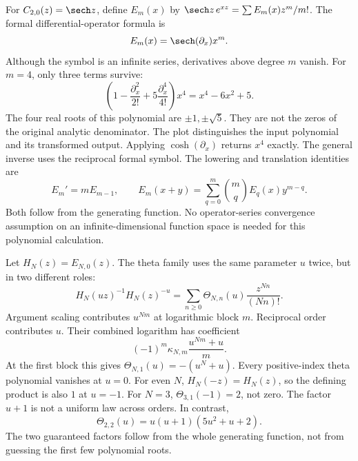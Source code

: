 For $C_{2,0}(z)=\sech z$, define $E_m(x)$ by $\sech z\,e^{xz}=\sum E_m(x)z^m/m!$. The formal differential-operator formula is
\[
E_m(x)=\sech(\partial_x)x^m.
\]
Although the symbol is an infinite series, derivatives above degree $m$ vanish.
For $m=4$, only three terms survive:
\[
\left(1-\frac{\partial_x^2}{2!}+5\frac{\partial_x^4}{4!}\right)x^4
=x^4-6x^2+5.
\]
The four real roots of this polynomial are $\pm1,\pm\sqrt5$. They are not the zeros of the original analytic denominator. The plot distinguishes the input polynomial and its transformed output.
Applying $\cosh(\partial_x)$ returns $x^4$ exactly. The general inverse uses the reciprocal formal symbol. The lowering and translation identities are
\[
E_m'=mE_{m-1},\qquad E_m(x+y)=\sum_{q=0}^m\binom mqE_q(x)y^{m-q}.
\]
Both follow from the generating function. No operator-series convergence assumption on an infinite-dimensional function space is needed for this polynomial calculation.

Let $H_N(z)=E_{N,0}(z)$. The theta family uses the same parameter $u$ twice, but in two different roles:
\[
H_N(uz)^{-1}H_N(z)^{-u}
=\sum_{n\ge0}\Theta_{N,n}(u)\frac{z^{Nn}}{(Nn)!}.
\]
Argument scaling contributes $u^{Nm}$ at logarithmic block $m$. Reciprocal order contributes $u$.
Their combined logarithm has coefficient
\[
(-1)^m\kappa_{N,m}\frac{u^{Nm}+u}{m}.
\]
At the first block this gives $\Theta_{N,1}(u)=-(u^N+u)$. Every positive-index theta polynomial vanishes at $u=0$. For even $N$, $H_N(-z)=H_N(z)$, so the defining product is also $1$ at $u=-1$.
For $N=3$, $\Theta_{3,1}(-1)=2$, not zero. The factor $u+1$ is not a uniform law across orders. In contrast,
\[
\Theta_{2,2}(u)=u(u+1)(5u^2+u+2).
\]
The two guaranteed factors follow from the whole generating function, not from guessing the first few polynomial roots.

